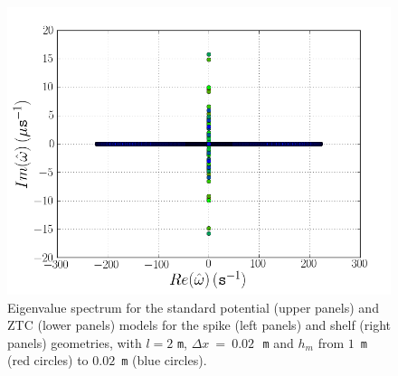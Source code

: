 \begin{figure}
  \includegraphics[width=\twofigs]{chapters/lopes/png/L2_dx_0_02_hm_shelf_spectrum_Zhao.png}
  \caption{Eigenvalue spectrum for the standard potential (upper
    panels) and ZTC (lower panels) models for the spike (left panels) and
    shelf (right panels) geometries, with $l=2$ {\tt m}, $\Delta
    x~=~0.02$\,~{\tt m} and $h_m$ from $1$~{\tt m} (red circles) to
    $0.02$~{\tt m} (blue circles).}
  \label{fig:lopes:spectrumhm1}
\end{figure}

